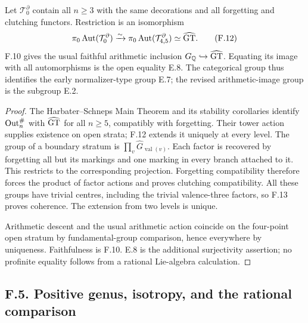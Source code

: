 Let $\mathcal T^{\partial}_0$ contain all $n\geq3$ with the same decorations and all forgetting and clutching functors. Restriction is an isomorphism
\[
 \pi_0\operatorname{Aut}(\mathcal T^{\partial}_0)
 \xrightarrow{\sim}\pi_0\operatorname{Aut}(\mathcal T^{\partial}_{4,5})
 \simeq\widehat{\mathrm{GT}}.                                                \tag{F.12}
\]
F.10 gives the usual faithful arithmetic inclusion $G_{\mathbb Q}\hookrightarrow\widehat{\mathrm{GT}}$. Equating its image with all automorphisms is the open equality E.8. The categorical group thus identifies the early normalizer-type group E.7; the revised arithmetic-image group is the subgroup E.2.
\begin{proof}
The Harbater--Schneps Main Theorem and its stability corollaries identify $\operatorname{Out}_n^\#$ with $\widehat{\mathrm{GT}}$ for all $n\geq5$, compatibly with forgetting. Their tower action supplies existence on open strata; F.12 extends it uniquely at every level. The group of a boundary stratum is $\prod_v\widehat G_{\operatorname{val}(v)}$. Each factor is recovered by forgetting all but its markings and one marking in every branch attached to it. This restricts to the corresponding projection. Forgetting compatibility therefore forces the product of factor actions and proves clutching compatibility. All these groups have trivial centres, including the trivial valence-three factors, so F.13 proves coherence. The extension from two levels is unique.

Arithmetic descent and the usual arithmetic action coincide on the four-point open stratum by fundamental-group comparison, hence everywhere by uniqueness. Faithfulness is F.10. E.8 is the additional surjectivity assertion; no profinite equality follows from a rational Lie-algebra calculation.
\end{proof}

\subsection{F.5. Positive genus, isotropy, and the rational comparison}

